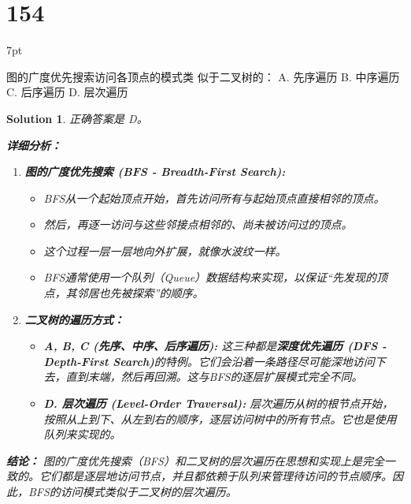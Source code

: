 \documentclass[UTF8]{report}
\newtheorem{solution}{Solution}
\theoremstyle{MyLineTheoremStyle} %
\theoremstyle{MyBlockTheoremStyle} %
\theoremstyle{MySubsubsectionStyle} %
\newenvironment{graybox}{%
        \def\FrameCommand{%
        \hspace{1pt}%
        {\color{gray}\small \vrule width 2pt}%
        {\color{graybox_color}\vrule width 4pt}%
        \colorbox{graybox_color}%
        }%
        \MakeFramed{\advance\hsize-\width\FrameRestore}%
        \noindent\hspace{-4.55pt}%
        \begin{adjustwidth}{}{7pt}%
        \vspace{2pt}\vspace{2pt}%
        }
        {%
        \vspace{2pt}\end{adjustwidth}\endMakeFramed%
        }
\begin{document}
\section*{154}
\begin{graybox}
图的广度优先搜索访问各顶点的模式类
似于二叉树的：
A. 先序遍历
B. 中序遍历
C. 后序遍历
D. 层次遍历
\end{graybox}

\begin{solution}
正确答案是 D。

\textbf{详细分析：}

\begin{enumerate}
    \item \textbf{图的广度优先搜索 (BFS - Breadth-First Search):}
    \begin{itemize}
        \item BFS从一个起始顶点开始，首先访问所有与起始顶点直接相邻的顶点。
        \item 然后，再逐一访问与这些邻接点相邻的、尚未被访问过的顶点。
        \item 这个过程一层一层地向外扩展，就像水波纹一样。
        \item BFS通常使用一个队列（Queue）数据结构来实现，以保证“先发现的顶点，其邻居也先被探索”的顺序。
    \end{itemize}

    \item \textbf{二叉树的遍历方式：}
    \begin{itemize}
        \item \textbf{A, B, C (先序、中序、后序遍历):} 这三种都是\textbf{深度优先遍历 (DFS - Depth-First Search)}的特例。它们会沿着一条路径尽可能深地访问下去，直到末端，然后再回溯。这与BFS的逐层扩展模式完全不同。
        \item \textbf{D. 层次遍历 (Level-Order Traversal):} 层次遍历从树的根节点开始，按照从上到下、从左到右的顺序，逐层访问树中的所有节点。它也是使用队列来实现的。
    \end{itemize}
\end{enumerate}

\textbf{结论：}
图的广度优先搜索（BFS）和二叉树的层次遍历在思想和实现上是完全一致的。它们都是逐层地访问节点，并且都依赖于队列来管理待访问的节点顺序。因此，BFS的访问模式类似于二叉树的层次遍历。
\end{solution}
\end{document}
